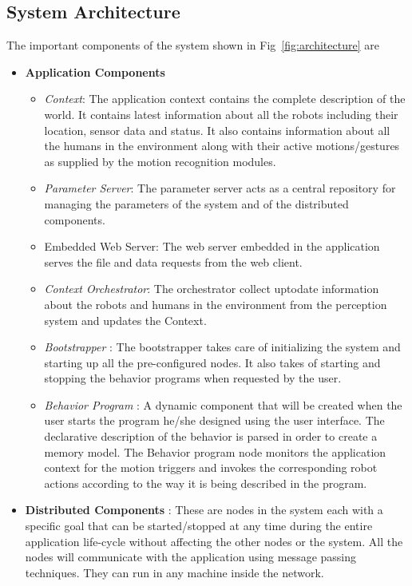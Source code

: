 \documentclass{llncs}
\begin{document}
\subsection{System Architecture}
%
The important components of the system shown in Fig~\ref{fig:architecture} are
\begin{itemize}
\item \textbf{Application Components}
\begin{itemize}
\item \emph{Context}: The application context contains the complete description of the world. It contains latest information about all the robots including their location, sensor data and status. It also contains information about all the humans in the environment along with their active motions/gestures as supplied by the motion recognition modules.
\item \emph{Parameter Server}: The parameter server acts as a central repository for managing the parameters of the system and of the distributed components.
\item Embedded Web Server: The web server embedded in the application serves the file and data requests from the web client.
\item \emph{Context Orchestrator}: The orchestrator collect uptodate information about the robots and humans in the environment from the perception system and updates the Context.
\item \emph{Bootstrapper} : The bootstrapper takes care of initializing the system and starting up all the pre-configured nodes. It also takes of starting and stopping the behavior programs when requested by the user. 
\item \emph{Behavior Program} : A dynamic component that will be created when the user starts the program he/she designed using the user interface. The declarative description of the behavior is parsed in order to create a memory model. The Behavior program node monitors the application context for the motion triggers and invokes the corresponding robot actions according to the way it is being described in the program.
\end{itemize}
\item \textbf{Distributed Components} : These are nodes in the system each with a specific goal that can be started/stopped at any time during the entire application life-cycle without affecting the other nodes or the system. All the nodes will communicate with the application using message passing techniques. They can run in any machine inside the network.

\end{itemize}
\end{document}
